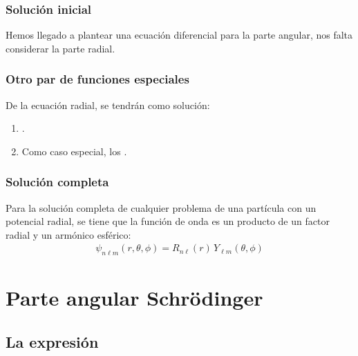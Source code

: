 \documentclass[12pt]{beamer}
\begin{document}
\begin{frame}
\frametitle{Solución inicial}
Hemos llegado a plantear una ecuación diferencial para la parte angular, \pause nos falta considerar la parte radial.
\end{frame}
\begin{frame}
\frametitle{Otro par de funciones especiales}
De  la ecuación radial, se tendrán como solución:
\begin{enumerate}[<+->]
\item \textbf{}.
\item Como caso especial, los \textbf{}.
\end{enumerate}
\end{frame}
\begin{frame}
\frametitle{Solución completa}
Para la solución completa de cualquier problema de una partícula con un potencial radial, se tiene que la función de onda es un producto de un factor radial y un armónico esférico:
\pause
\begin{align*}
\psi_{n \ell m} (r, \theta, \phi) = R_{n \ell} (r) \, Y_{\ell m} (\theta, \phi)
\end{align*}
\end{frame}

\section{Parte angular Schrödinger}
\subsection{La expresión}
\end{document}
